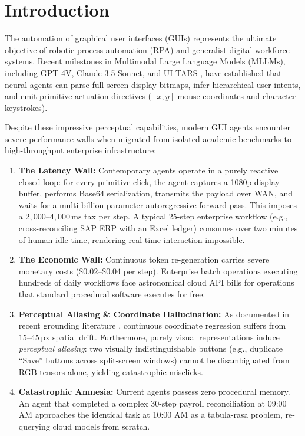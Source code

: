 \documentclass[10pt]{article}
\begin{document}
\section{Introduction}
\label{sec:intro}

The automation of graphical user interfaces (GUIs) represents the ultimate objective of robotic process automation (RPA) and generalist digital workforce systems. Recent milestones in Multimodal Large Language Models (MLLMs), including GPT-4V, Claude 3.5 Sonnet, and UI-TARS \cite{xie2024osworld, bytedance2025uitars, anthropic2024claude}, have established that neural agents can parse full-screen display bitmaps, infer hierarchical user intents, and emit primitive actuation directives ($[x, y]$ mouse coordinates and character keystrokes).

Despite these impressive perceptual capabilities, modern GUI agents encounter severe performance walls when migrated from isolated academic benchmarks to high-throughput enterprise infrastructure:
\begin{enumerate}[leftmargin=*]
    \item \textbf{The Latency Wall:} Contemporary agents operate in a purely reactive closed loop: for every primitive click, the agent captures a 1080p display buffer, performs Base64 serialization, transmits the payload over WAN, and waits for a multi-billion parameter autoregressive forward pass. This imposes a $2,000\text{--}4,000\,\text{ms}$ tax per step. A typical 25-step enterprise workflow (e.g., cross-reconciling SAP ERP with an Excel ledger) consumes over two minutes of human idle time, rendering real-time interaction impossible.
    \item \textbf{The Economic Wall:} Continuous token re-generation carries severe monetary costs ($\$0.02\text{--}\$0.04$ per step). Enterprise batch operations executing hundreds of daily workflows face astronomical cloud API bills for operations that standard procedural software executes for free.
    \item \textbf{Perceptual Aliasing \& Coordinate Hallucination:} As documented in recent grounding literature \cite{cheng2024seeclick, lu2024omniparser}, continuous coordinate regression suffers from $15\text{--}45\,\text{px}$ spatial drift. Furthermore, purely visual representations induce \textit{perceptual aliasing}: two visually indistinguishable buttons (e.g., duplicate ``Save'' buttons across split-screen windows) cannot be disambiguated from RGB tensors alone, yielding catastrophic misclicks.
    \item \textbf{Catastrophic Amnesia:} Current agents possess zero procedural memory. An agent that completed a complex 30-step payroll reconciliation at 09:00 AM approaches the identical task at 10:00 AM as a tabula-rasa problem, re-querying cloud models from scratch.
\end{enumerate}
\end{document}
